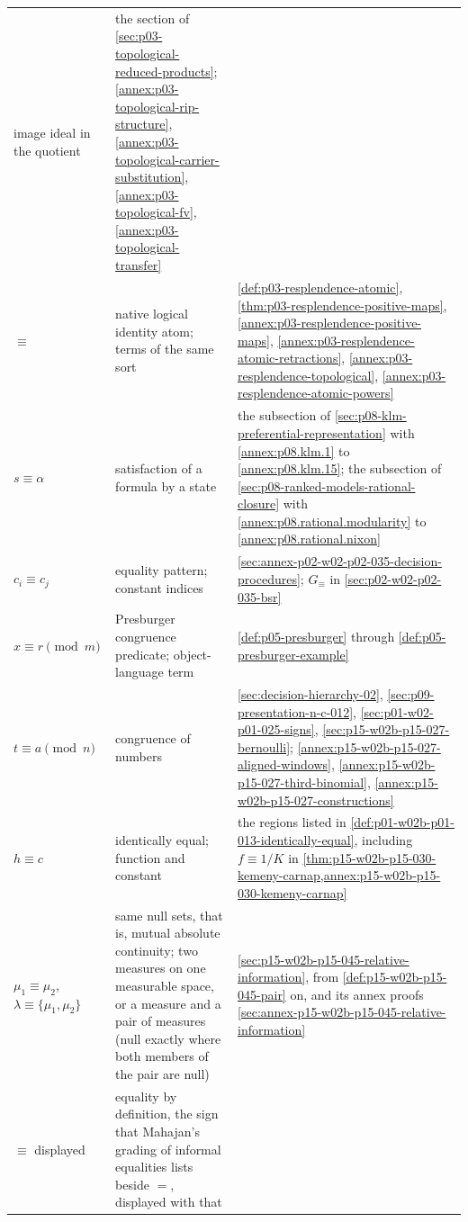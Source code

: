 \begin{longtable}{@{}p{}p{}p{}@{}}
image ideal in the quotient & the section of
\cref{sec:p03-topological-reduced-products};
\cref{annex:p03-topological-rip-structure},
\cref{annex:p03-topological-carrier-substitution},
\cref{annex:p03-topological-fv}, \cref{annex:p03-topological-transfer} \\
\(\equiv\) & native logical identity atom; terms of the same sort &
\cref{def:p03-resplendence-atomic}, \cref{thm:p03-resplendence-positive-maps},
\cref{annex:p03-resplendence-positive-maps},
\cref{annex:p03-resplendence-atomic-retractions},
\cref{annex:p03-resplendence-topological},
\cref{annex:p03-resplendence-atomic-powers} \\
\(s\equiv\alpha\) & satisfaction of a formula by a state & the subsection of
\cref{sec:p08-klm-preferential-representation} with \cref{annex:p08.klm.1}
to \cref{annex:p08.klm.15}; the subsection of
\cref{sec:p08-ranked-models-rational-closure} with
\cref{annex:p08.rational.modularity} to \cref{annex:p08.rational.nixon} \\
\(c_i\equiv c_j\) & equality pattern; constant indices &
\cref{sec:annex-p02-w02-p02-035-decision-procedures}; \(G_\equiv\) in
\cref{sec:p02-w02-p02-035-bsr} \\
\(x\equiv r\pmod m\) & Presburger congruence predicate; object-language term &
\cref{def:p05-presburger} through \cref{def:p05-presburger-example} \\
\(t\equiv a\pmod n\) & congruence of numbers & \cref{sec:decision-hierarchy-02},
\cref{sec:p09-presentation-n-c-012}, \cref{sec:p01-w02-p01-025-signs},
\cref{sec:p15-w02b-p15-027-bernoulli};
\cref{annex:p15-w02b-p15-027-aligned-windows},
\cref{annex:p15-w02b-p15-027-third-binomial},
\cref{annex:p15-w02b-p15-027-constructions} \\
\(h\equiv c\) & identically equal; function and constant &
the regions listed in \cref{def:p01-w02b-p01-013-identically-equal},
including \(f\equiv1/K\) in
\cref{thm:p15-w02b-p15-030-kemeny-carnap,annex:p15-w02b-p15-030-kemeny-carnap} \\
\(\mu_1\equiv\mu_2\), \(\lambda\equiv\{\mu_1,\mu_2\}\) & same null sets,
that is, mutual absolute continuity; two measures on one measurable space,
or a measure and a pair of measures (null exactly where both members of the
pair are null) & \cref{sec:p15-w02b-p15-045-relative-information}, from
\cref{def:p15-w02b-p15-045-pair} on, and its annex proofs
\cref{sec:annex-p15-w02b-p15-045-relative-information} \\
\(\equiv\) displayed & equality by definition, the sign that Mahajan's
grading of informal equalities lists beside \(=\), displayed with that

\end{longtable}
